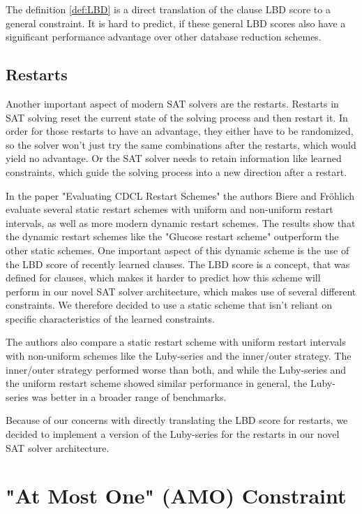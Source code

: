 The definition \ref{def:LBD} is a direct translation of the clause LBD score to a general constraint. It is hard to predict, if these general LBD scores also have a significant performance advantage over other database reduction schemes.

\subsection{Restarts}

Another important aspect of modern SAT solvers are the restarts. Restarts in SAT solving reset the current state of the solving process and then restart it. In order for those restarts to have an advantage, they either have to be randomized, so the solver won't just try the same combinations after the restarts, which would yield no advantage. Or the SAT solver needs to retain information like learned constraints, which guide the solving process into a new direction after a restart.
\cite{biere2009handbook}

In the paper "Evaluating CDCL Restart Schemes" \cite{biere2015evaluatingRestarts} the authors Biere and Fröhlich evaluate several static restart schemes with uniform and non-uniform restart intervals, as well as more modern dynamic restart schemes. The results show that the dynamic restart schemes like the "Glucose restart scheme" \cite{biere2015evaluatingRestarts} outperform the other static schemes. One important aspect of this dynamic scheme is the use of the LBD score of recently learned clauses. The LBD score is a concept, that was defined for clauses, which makes it harder to predict how this scheme will perform in our novel SAT solver architecture, which makes use of several different constraints. We therefore decided to use a static scheme that isn't reliant on specific characteristics of the learned constraints.

The authors also compare a static restart scheme with uniform restart intervals with non-uniform schemes like the Luby-series and the inner/outer strategy. The inner/outer strategy performed worse than both, and while the Luby-series and the uniform restart scheme showed similar performance in general, the Luby-series was better in a broader range of benchmarks. \cite{biere2015evaluatingRestarts}

Because of our concerns with directly translating the LBD score for restarts, we decided to implement a version of the Luby-series for the restarts in our novel SAT solver architecture.

\section{"At Most One" (AMO) Constraint}
\label{sec:AMOConstraint}

